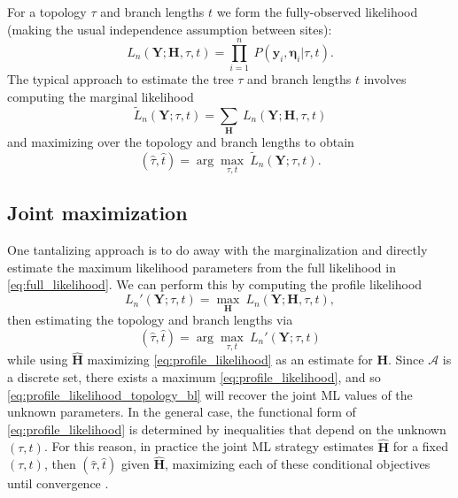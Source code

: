\documentclass[a4paper]{article}
\newcommand{\alphabet}{\mathcal{A}}
\newcommand{\fullAlignment}{\mathbf{Y}}
\newcommand{\alignmentColumn}{\mathbf{y}}
\newcommand{\fullAncestralStates}{\mathbf{H}}
\newcommand{\ancestralStateColumn}{\boldsymbol\eta}
\newcommand{\nCols}{n}
\begin{document}
For a topology $\tau$ and branch lengths $t$ we form the fully-observed likelihood (making the usual independence assumption between sites):
\begin{equation}
\label{eq:full_likelihood}
L_\nCols(\fullAlignment;\fullAncestralStates, \tau, t) = \prod_{i=1}^{\nCols} \ P(\alignmentColumn_i, \ancestralStateColumn_i | \tau, t).
\end{equation}
The typical approach to estimate the tree $\tau$ and branch lengths $t$ involves computing the marginal likelihood
\begin{equation}
\label{eq:marginal_likelihood}
\tilde{L}_\nCols(\fullAlignment; \tau, t) = \sum_{\fullAncestralStates} \ L_\nCols(\fullAlignment;\fullAncestralStates, \tau, t)
\end{equation}
and maximizing over the topology and branch lengths to obtain
$$
(\hat{\tau}, \hat{t}) = \arg\max_{\tau, t} \  \tilde{L}_\nCols(\fullAlignment; \tau, t).
$$

\subsection{Joint maximization}

One tantalizing approach is to do away with the marginalization and directly estimate the maximum likelihood parameters from the full likelihood in \eqref{eq:full_likelihood}.
We can perform this by computing the profile likelihood
\begin{equation}
\label{eq:profile_likelihood}
L_\nCols'(\fullAlignment;\tau, t) = \max_{\fullAncestralStates} \ L_\nCols(\fullAlignment;\fullAncestralStates, \tau, t),
\end{equation}
then estimating the topology and branch lengths via
\begin{equation}
\label{eq:profile_likelihood_topology_bl}
(\hat{\tau}, \hat{t}) = \arg\max_{\tau, t} \ L_\nCols'(\fullAlignment;\tau, t)
\end{equation}
while using $\hat{\fullAncestralStates}$ maximizing \eqref{eq:profile_likelihood} as an estimate for $\fullAncestralStates$.
Since $\alphabet$ is a discrete set, there exists a maximum \eqref{eq:profile_likelihood}, and so \eqref{eq:profile_likelihood_topology_bl} will recover the joint ML values of the unknown parameters.
In the general case, the functional form of \eqref{eq:profile_likelihood} is determined by inequalities that depend on the unknown $(\tau,t)$.
For this reason, in practice the joint ML strategy estimates $\hat{\fullAncestralStates}$ for a fixed $(\tau,t)$, then $(\hat{\tau},\hat{t})$ given $\hat{\fullAncestralStates}$, maximizing each of these conditional objectives until convergence \cite{Neher2017}.
\end{document}
